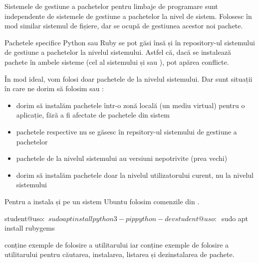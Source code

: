 Sistemele de gestiune a pachetelor pentru limbaje de programare sunt independente de sistemele de gestiune a pachetelor la nivel de sistem.
Folosesc în mod similar sistemul de fișiere, dar se ocupă de gestiunea acestor noi pachete.

Pachetele specifice Python sau Ruby se pot găsi însă și în repository-ul sistemului de gestiune a pachetelor la nivelul sistemului.
Astfel că, dacă se instalează pachete în ambele sisteme (cel al sistemului și  sau ), pot apărea conflicte.

În mod ideal, vom folosi doar pachetele de la nivelul sistemului.
Dar sunt situații în care ne dorim să folosim  sau :

\begin{itemize}
  \item dorim să instalăm pachetele într-o zonă locală (un mediu virtual) pentru o aplicație, fără a fi afectate de pachetele din sistem
  \item pachetele respective nu se găsesc în repsitory-ul sistemului de gestiune a pachetelor
  \item pachetele de la nivelul sistemului au versiuni nepotrivite (prea vechi)
  \item dorim să instalăm pachetele doar la nivelul utilizatorului curent, nu la nivelul sistemului
\end{itemize}

Pentru a instala  și  pe un sistem Ubuntu folosim comenzile din .

\begin{screen}[caption={Instalarea Python pip și Ruby gem pe Ubuntu},label={lst:package:install-pip-gem}]
student@uso:~$ sudo apt install python3-pip python-dev

student@uso:~$ sudo apt install rubygems
\end{screen}

 conține exemple de folosire a utilitarului  iar  conține exemple de folosire a utilitarului  pentru căutarea, instalarea, listarea și dezinstalarea de pachete.

